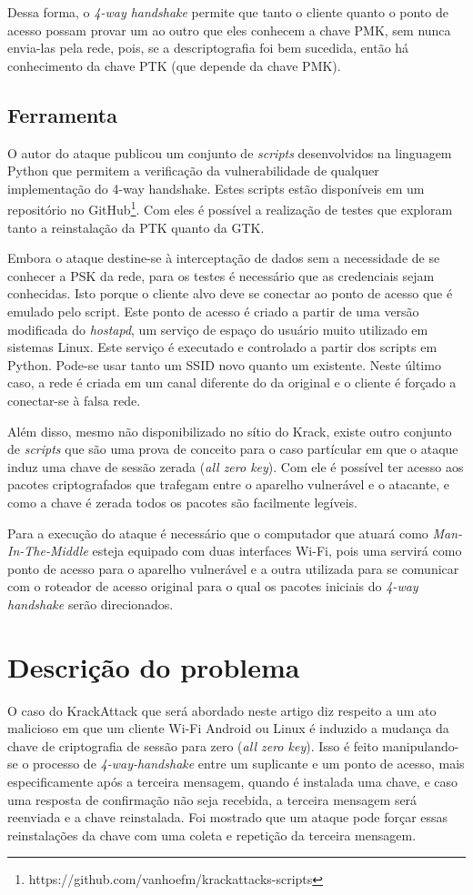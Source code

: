 \documentclass[12pt]{article}
\begin{document}
	Dessa forma, o \textit{4-way handshake} permite que tanto o cliente quanto o ponto de acesso possam provar um ao outro que eles conhecem a chave PMK, sem nunca envia-las pela rede, pois, se a descriptografia foi bem sucedida, então há conhecimento da chave PTK (que depende da chave PMK).
	
\subsection{Ferramenta}
O autor do ataque publicou um conjunto de \textit{scripts} desenvolvidos na linguagem Python que permitem a verificação da vulnerabilidade de qualquer implementação do 4-way handshake. Estes scripts estão disponíveis em um repositório no GitHub\footnote{https://github.com/vanhoefm/krackattacks-scripts}. Com eles é possível a realização de testes que exploram tanto a reinstalação da PTK quanto da GTK.

Embora o ataque destine-se à interceptação de dados sem a necessidade de se conhecer a PSK da rede, para os testes é necessário que as credenciais sejam conhecidas. Isto porque o cliente alvo deve se conectar ao ponto de acesso que é emulado pelo script. Este ponto de acesso é criado a partir de uma versão modificada do \textit{hostapd}, um serviço de espaço do usuário muito utilizado em sistemas Linux. Este serviço é executado e controlado a partir dos scripts em Python. Pode-se usar tanto um SSID novo quanto um existente. Neste último caso, a rede é criada em um canal diferente do da original e o cliente é forçado a conectar-se à falsa rede.

Além disso, mesmo não disponibilizado no sítio do Krack, existe outro conjunto de \textit{scripts} que são uma prova de conceito para o caso partícular em que o ataque induz uma chave de sessão zerada (\textit{all zero key}). Com ele é possível ter acesso aos pacotes criptografados que trafegam entre o aparelho vulnerável e o atacante, e como a chave é zerada todos os pacotes são facilmente legíveis.

Para a execução do ataque é necessário que o computador que atuará como \textit{Man-In-The-Middle} esteja equipado com duas interfaces Wi-Fi, pois uma servirá como ponto de acesso para o aparelho vulnerável e a outra utilizada para se comunicar com o roteador de acesso original para o qual os pacotes iniciais do \textit{4-way handshake} serão direcionados.


\section{Descrição do problema}
O caso do KrackAttack que será abordado neste artigo diz respeito a um ato malicioso em que um cliente Wi-Fi Android ou Linux é induzido a mudança da chave de criptografia de sessão para zero (\textit{all zero key}). Isso é feito manipulando-se o processo de \textit{4-way-handshake} entre um suplicante e um ponto de acesso, mais especificamente após a terceira mensagem, quando é instalada uma chave, e caso uma resposta de confirmação não seja recebida, a terceira mensagem será reenviada e a chave reinstalada. Foi mostrado que um ataque pode forçar essas reinstalações da chave com uma coleta e repetição da terceira mensagem. 
\end{document}

